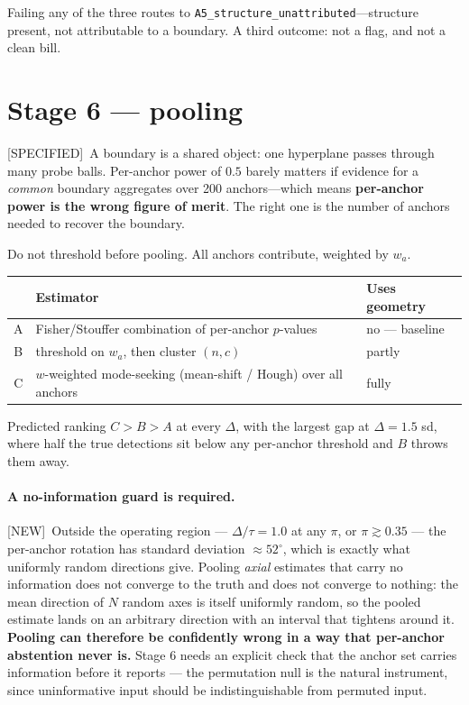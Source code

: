\documentclass[11pt]{article}
\newcommand{\provtag}[2]{{\footnotesize\sffamily\textcolor{#1}{[#2]}}}
\newcommand{\SPEC}{\provtag{specblue}{SPECIFIED}}
\newcommand{\NEWT}{\provtag{newmag}{NEW}}
\begin{document}
\medskip
\noindent Failing any of the three routes to \texttt{A5\_structure\_unattributed}---structure
present, not attributable to a boundary. A third outcome: not a flag, and not a clean bill.

\section{Stage 6 --- pooling}
\label{sec:stage6}

\SPEC\ A boundary is a shared object: one hyperplane passes through many probe balls. Per-anchor
power of $0.5$ barely matters if evidence for a \emph{common} boundary aggregates over 200
anchors---which means \textbf{per-anchor power is the wrong figure of merit}. The right one is the
number of anchors needed to recover the boundary.

Do not threshold before pooling. All anchors contribute, weighted by $w_a$.

\begin{table}[h]
\small\centering
\begin{tabular}{@{}cp{}p{}@{}}
\toprule
& \textbf{\sffamily Estimator} & \textbf{\sffamily Uses geometry}\\
\midrule
A & Fisher/Stouffer combination of per-anchor $p$-values & no --- baseline\\
B & threshold on $w_a$, then cluster $(n,c)$ & partly\\
C & $w$-weighted mode-seeking (mean-shift / Hough) over all anchors & fully\\
\bottomrule
\end{tabular}
\end{table}

\noindent Predicted ranking $C > B > A$ at every $\Delta$, with the largest gap at
$\Delta = 1.5$ sd, where half the true detections sit below any per-anchor threshold and $B$
throws them away.

\paragraph{A no-information guard is required.} \NEWT\ Outside the operating region ---
$\Delta/\tau = 1.0$ at any $\pi$, or $\pi \gtrsim 0.35$ --- the per-anchor rotation has
standard deviation $\approx 52^\circ$, which is exactly what uniformly random directions
give. Pooling \emph{axial} estimates that carry no information does not converge to the
truth and does not converge to nothing: the mean direction of $N$ random axes is itself
uniformly random, so the pooled estimate lands on an arbitrary direction with an interval
that tightens around it. \textbf{Pooling can therefore be confidently wrong in a way that
per-anchor abstention never is.} Stage 6 needs an explicit check that the anchor set carries
information before it reports --- the permutation null is the natural instrument, since
uninformative input should be indistinguishable from permuted input.
\end{document}
